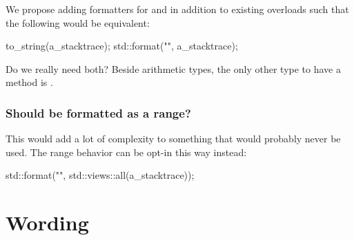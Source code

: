 \documentclass{wg21}
\begin{document}
We propose adding formatters for  and  in addition to existing  overloads such that the following would be equivalent:

\begin{colorblock}
to_string(a_stacktrace);
std::format("{}", a_stacktrace);
\end{colorblock}

Do we really need both?
Beside arithmetic types, the only other type to have a  method is .

\subsubsection{Should  be formatted as a range?}

This would add a lot of complexity to something that would probably never be used.
The range behavior can be opt-in this way instead:

\begin{colorblock}
std::format("{}", std::views::all(a_stacktrace));
\end{colorblock}

\section{Wording}
\end{document}

